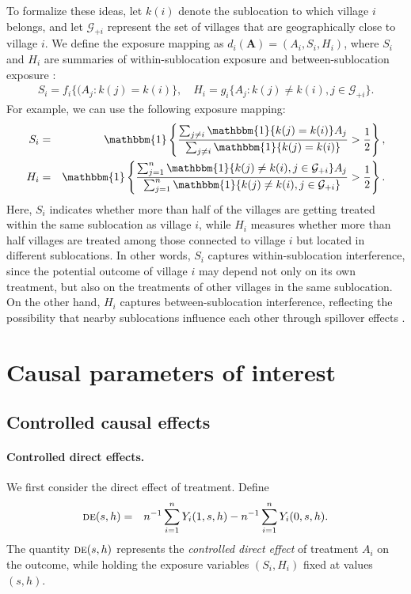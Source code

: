 \documentclass{article}
\newcommand{\bA}{\boldsymbol{A}}
\newcommand{\cG}{\mathcal{G}}
\newcommand{\sumi}{\sum_{i=1}^n}
\newcommand{\sumj}{\sum_{j=1}^n}
\newcommand{\de}{\textsc{de}}
\newcommand{\indicator}{\mathbbm{1}}
\begin{document}
To formalize these ideas, let $k(i)$ denote the sublocation to which village $i$ belongs, and let $\cG_{+i}$ represent the set of villages that are geographically close to village $i$. We define the exposure mapping as $d_i(\bA) = (A_{i}, S_{i}, H_{i})$, where $S_i$ and $H_i$ are summaries of within-sublocation exposure and between-sublocation exposure \citep{aronow2017estimating}:
\begin{eqnarray*}
    S_{i} = f_i\{(A_{j}: k(j)=k(i)\}, \quad 
    H_{i} = g_i\{A_j: k(j)\neq k(i), j\in\cG_{+i}\}. 
\end{eqnarray*}
For example, we can use the following exposure mapping:  
\begin{eqnarray*}
    S_{i} &=& \indicator\left\{\frac{\sum_{j\neq i}\indicator\{k(j)=k(i)\} A_{j}}{\sum_{j\neq i}\indicator\{k(j)=k(i)\}} > \frac{1}{2}\right\},  \\
    H_{i} &=& \indicator \left\{\frac{\sumj \indicator\{k(j)\neq k(i), j\in\cG_{+i}\}A_{j}}{\sumj \indicator\{k(j)\neq k(i), j\in\cG_{+i}\}} > \frac{1}{2}\right\}.
\end{eqnarray*}
Here, $S_{i}$ indicates whether more than half of the villages are getting treated within the same sublocation as village $i$, while $H_{i}$ measures whether more than half villages are treated among those connected to village $i$ but located in different sublocations. In other words, $S_{i}$ captures within-sublocation interference, since the potential outcome of village $i$ may depend not only on its own treatment, but also on the treatments of other villages in the same sublocation. On the other hand, $H_{i}$ captures between-sublocation interference, reflecting the possibility that nearby sublocations influence each other through spillover effects \citep{egger2022general}. 

\section{Causal parameters of interest}
\label{sec::parameters}
\subsection{Controlled causal effects}

\paragraph{Controlled direct effects.}
We first consider the direct effect of treatment. Define
\begin{eqnarray*}
    \de(s,h) &=& n^{-1}\sumi Y_{i}(1,s,h) - n^{-1}\sumi Y_{i}(0,s,h).
\end{eqnarray*}
The quantity $\de(s,h)$ represents the \textit{controlled direct effect} of treatment $A_{i}$ on the outcome, while holding the exposure variables $(S_{i},H_{i})$ fixed at values $(s,h)$.
\end{document}
